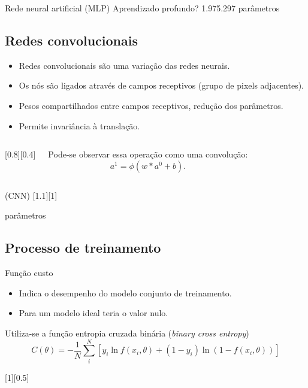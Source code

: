\begin{frame}{Rede neural artificial (MLP)}
	\pause
	\vspace{-30pt}
	\center Aprendizado profundo?
	1.975.297 parâmetros
\end{frame}

\subsection{Redes convolucionais}
\begin{frame}{\insertsubsection}
	\begin{itemize}
	\item Redes convolucionais são uma variação das redes neurais.
	\item Os nós são ligados através de campos receptivos (grupo de pixels adjacentes).
	\item Pesos compartilhados entre campos receptivos, redução dos parâmetros.
	\item Permite invariância à translação.
	\end{itemize}

	\begin{columns}
		[0.8][0.4]

		Pode-se observar essa operação como uma convolução:
		\begin{equation*}
		a^1 = \phi(w \ast a^0 + b).
		\end{equation*}

	\end{columns}

\end{frame}

\begin{frame}{\insertsubsection (CNN)}
	[1.1][1]

	\vspace{-30pt}
	 parâmetros
\end{frame}

\subsection{Processo de treinamento}

\begin{frame}{Função custo}
	\begin{itemize}
	\item Indica o desempenho do modelo conjunto de treinamento.
	\item Para um modelo ideal teria o valor nulo.
	\end{itemize}

	\pause

	Utiliza-se a função entropia cruzada binária (\textit{binary cross entropy})
	\begin{equation*}
	C(\theta) = -\frac{1}{N} \sum_i^N \left[y_i \ln f(x_i,\theta) + (1-y_i) \ln (1-f(x_i,\theta))\right]
	\end{equation*}

	[0.5]
\end{frame}

